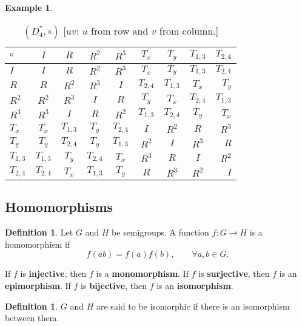 \documentclass[leqno,DIV=calc,paper=a4,fontsize=11pt]{article}
\theoremstyle{definition}
\newtheorem{defn}[thm]{Definition}
\newtheorem{exmp}[thm]{Example}
\theoremstyle{plain}
\theoremstyle{remark}
\begin{document}
\begin{exmp}
\begin{table}[!htb]
\centering
\begin{tabular}{ | l |c|c|c|c|c|c|c| r | }
    \hline
    $\circ $  & $I$       & $R$       & $R^2$     & $R^3$     & $T_x$     & $T_y$     & $T_{1,3}$ & $T_{2,4}$ \\ \hline
    $I$       & $I$       & $R$       & $R^2$     & $R^3$     & $T_x$     & $T_y$     & $T_{1,3}$ & $T_{2,4}$ \\ \hline
    $R$       & $R$       & $R^2$     & $R^3$     & $I$       & $T_{2,4}$ & $T_{1,3}$ & $T_x$     & $T_y$     \\ \hline
    $R^2$     & $R^2$     & $R^3$     & $I$       & $R$       & $T_y$     & $T_x$     & $T_{2,4}$ & $T_{1,3}$ \\ \hline
    $R^3$     & $R^3$     & $I$       & $R$       & $R^2$     & $T_{1,3}$ & $T_{2,4}$ & $T_y$     & $T_x$     \\ \hline
    $T_x$     & $T_x$     & $T_{1,3}$ & $T_y$     & $T_{2,4}$ & $I$       & $R^2$     & $R$       & $R^3$     \\ \hline
    $T_y$     & $T_y$     & $T_{2,4}$ & $T_y$     & $T_{1,3}$ & $R^2$     & $I$       & $R^3$     & $R$       \\ \hline
    $T_{1,3}$ & $T_{1,3}$ & $T_y$     & $T_{2,4}$ & $T_x$     & $R^3$     & $R$       & $I$       & $R^2$     \\ \hline
    $T_{2,4}$ & $T_{2,4}$ & $T_x$     & $T_{1,3}$ & $T_y$     & $R$       & $R^3$     & $R^2$     & $I$       \\ \hline
  \end{tabular}
  \caption{$(D_4^{*},\circ)$ [$uv$: $u$ from row and $v$ from column.]}
\end{table}
\end{exmp}

\subsection{Homomorphisms}
\begin{defn}
Let $G$ and $H$ be semigroups. A function $f:G\to H$ is a homomorphism if $$f(ab)=f(a)f(b),\qquad \forall a,b\in G.$$
\end{defn}
If $f$ is \textbf{injective}, then $f$ is a \textbf{monomorphism}. If $f$ is \textbf{surjective}, then $f$ is an \textbf{epimorphism}. If $f$ is \textbf{bijective}, then $f$ is an \textbf{isomorphism}.
\begin{defn}
$G$ and $H$ are said to be isomorphic if there is an isomorphism between them.
\end{defn}
\end{document}
